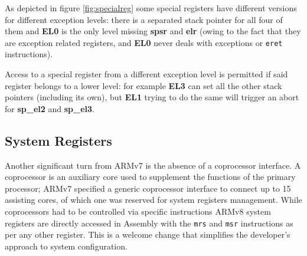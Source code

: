 \documentclass[12pt,a4paper,openright,twoside]{report}
\begin{document}
As depicted in figure \ref{fig:specialreg} some special registers have different
versions for different exception levels: there is a separated stack pointer 
for all four of them and \textbf{EL0} is the only level missing \textbf{spsr}
and \textbf{elr} (owing to the fact that they are exception related registers, and
\textbf{EL0} never deals with exceptions or {\tt eret} instructions).

Access to a special register from a different exception level is permitted if 
said register belongs to a lower level: for example \textbf{EL3} can set all the
other stack pointers (including its own), but \textbf{EL1} trying 
to do the same will trigger an abort for \textbf{sp\_el2} and \textbf{sp\_el3}.

\subsection{System Registers}
Another significant turn from ARMv7 is the absence of a coprocessor interface.
A coprocessor is an auxiliary core used to supplement the functions of the primary
processor; ARMv7 specified a generic coprocessor interface to connect up to 
15 assisting cores, of which one was reserved for system registers management.
While coprocessors had to be controlled via specific instructions ARMv8 system registers
are directly accessed in Assembly with the {\tt mrs} and {\tt msr} instructions
as per any other register. This is a welcome change that simplifies the developer's
approach to system configuration.
\end{document}
